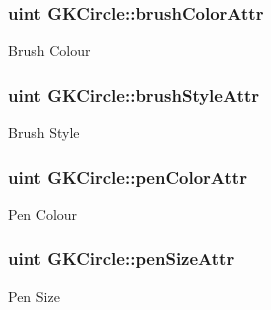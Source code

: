 \subsubsection[{\texorpdfstring{brush\+Color\+Attr}{brushColorAttr}}]{\setlength{\rightskip}{0pt plus 5cm}uint G\+K\+Circle\+::brush\+Color\+Attr\hspace{0.3cm}{\ttfamily [static]}}\hypertarget{classGKCircle_a0c8f5f5a201442b85f1d9749fe359b22}{}\label{classGKCircle_a0c8f5f5a201442b85f1d9749fe359b22}
Brush Colour 
\subsubsection[{\texorpdfstring{brush\+Style\+Attr}{brushStyleAttr}}]{\setlength{\rightskip}{0pt plus 5cm}uint G\+K\+Circle\+::brush\+Style\+Attr\hspace{0.3cm}{\ttfamily [static]}}\hypertarget{classGKCircle_aa0a92a1ecdff12dfb393f5d86886d640}{}\label{classGKCircle_aa0a92a1ecdff12dfb393f5d86886d640}
Brush Style 
\subsubsection[{\texorpdfstring{pen\+Color\+Attr}{penColorAttr}}]{\setlength{\rightskip}{0pt plus 5cm}uint G\+K\+Circle\+::pen\+Color\+Attr\hspace{0.3cm}{\ttfamily [static]}}\hypertarget{classGKCircle_a2fe3b334156d797f338f6266dfe1aa0b}{}\label{classGKCircle_a2fe3b334156d797f338f6266dfe1aa0b}
Pen Colour 
\subsubsection[{\texorpdfstring{pen\+Size\+Attr}{penSizeAttr}}]{\setlength{\rightskip}{0pt plus 5cm}uint G\+K\+Circle\+::pen\+Size\+Attr\hspace{0.3cm}{\ttfamily [static]}}\hypertarget{classGKCircle_adc9c156f7bafda83d9e429bbd96f3764}{}\label{classGKCircle_adc9c156f7bafda83d9e429bbd96f3764}
Pen Size 
